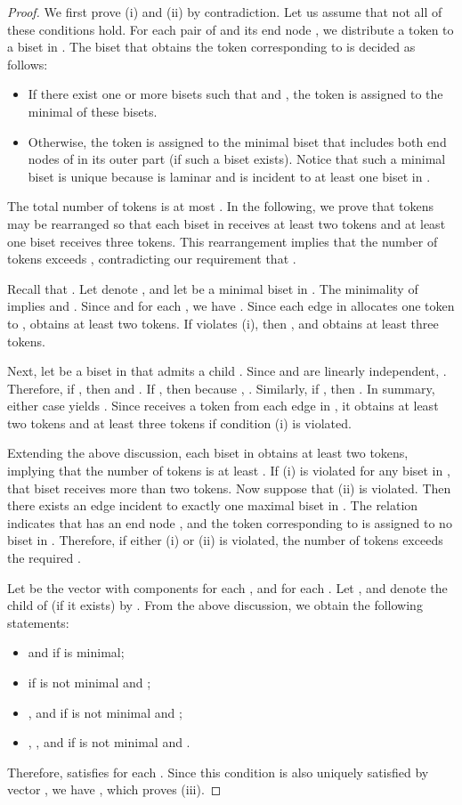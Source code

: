 \documentclass{article}
\begin{document}
\begin{proof}
We first prove (i) and (ii) by contradiction. Let us assume that not all of these
conditions hold. For each pair of  and its end node , we distribute a token
to a biset in . The biset that obtains the token corresponding to  is decided
as follows:
\begin{itemize}
 \item If there exist one or more bisets  such that 
	 and , the token is assigned to the minimal of these bisets.
\item Otherwise, the token is assigned to the minimal biset  that 
includes both end nodes of  in its outer part (if such a biset exists).
	Notice that such a minimal biset is unique because  is laminar and  is incident to at
	least one biset in .
\end{itemize}

The total number of tokens is at most . In the following, 
we prove that tokens may be rearranged so that each
biset in  receives at least two tokens and at least one biset receives three tokens. 
This rearrangement implies that the number of tokens exceeds
, contradicting our requirement that .

Recall that .
Let  denote , and
let  be a minimal biset in . 
The minimality of  implies 
and .
Since  and  for each 
, we have 
. 
Since each edge in  allocates one token to , 
obtains at least two tokens. If  violates (i), 
then , and
 obtains at least three tokens.

Next, let  be a biset in  that admits a child .
Since  and  are linearly independent,
.
Therefore,
if , then
 and .
If , then 
 because , 
. Similarly,
if , then 
.
In summary, either case yields
.
Since  receives a token from
each edge in , it obtains
at least two tokens and 
at least three tokens if condition (i) is violated.

Extending the above discussion, each biset in  obtains at least two tokens, implying that the number of tokens is at least . If (i) is violated
for any biset in ,
that biset receives more than two tokens. Now suppose that (ii) is violated. Then 
there exists an edge  incident to exactly one maximal biset  in . 
The relation  indicates that  has an end node ,
and the token corresponding to  is assigned to no biset in .
Therefore, if either (i) or (ii) is violated, the number of tokens exceeds the required .

Let  be the vector with components  for each , and 
for each .
Let , and denote the child of  (if it exists) by .
From the above discussion, we obtain the following statements:
\begin{itemize}
\item  and  if  is minimal;
\item  if
 is not minimal and ;
\item 
,  
and 
if
 is not minimal and ;
\item 
, , 
and 
if
 is not minimal and .
\end{itemize}
Therefore,  satisfies  
for each . 
Since this condition is also uniquely satisfied by vector ,
we have , which proves (iii).
\end{proof}
\end{document}
